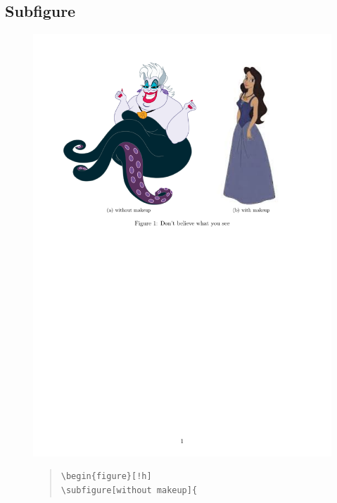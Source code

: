 \documentclass[12pt,a4paper]{report}
\begin{document}
\begin{CJK}{UTF8}{bkai}
\section{Subfigure}
\vspace{-0.5cm}
\begin{figure}[!h] 
\begin{minipage}[b]{0.5\textwidth} 
\centering 
\includegraphics[scale=0.3]{./pics/subfigure_example.pdf} 
\end{minipage}%
\begin{minipage}[b]{0.5\textwidth} 
\begin{footnotesize}
\begin{quote}
\begin{verbatim}
\begin{figure}[!h]
\subfigure[without makeup]{

\end{verbatim}
\end{quote}
\end{footnotesize}
\end{minipage}
\end{figure}
\end{CJK}
\end{document}

